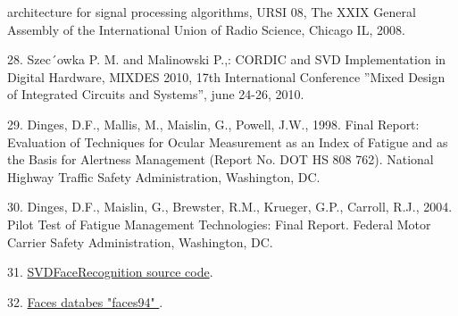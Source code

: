 architecture for signal processing algorithms, URSI 08, The XXIX General Assembly
of the International Union of Radio Science, Chicago IL, 2008.\par
28. Szec´owka P. M. and Malinowski P.,: CORDIC and SVD Implementation in Digital
Hardware, MIXDES 2010, 17th International Conference ”Mixed Design of
Integrated Circuits and Systems”, june 24-26, 2010.\par
29. Dinges, D.F., Mallis, M., Maislin, G., Powell, J.W., 1998. Final Report: Evaluation
of Techniques for Ocular Measurement as an Index of Fatigue and as the Basis for
Alertness Management (Report No. DOT HS 808 762). National Highway Traffic
Safety Administration, Washington, DC.\par
30. Dinges, D.F., Maislin, G., Brewster, R.M., Krueger, G.P., Carroll, R.J., 2004. Pilot
Test of Fatigue Management Technologies: Final Report. Federal Motor Carrier
Safety Administration, Washington, DC.\par
31. \href{https://github.com/Houd1ny/SVDFaceRecognition}{SVDFaceRecognition source code}. \par
32. \href{http://cswww.essex.ac.uk/mv/allfaces/faces94.html}{Faces databes "faces94" }. \par

